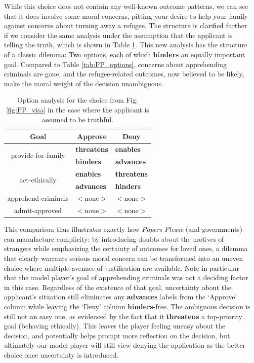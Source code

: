 \documentclass[arts,article,submit,moreauthors,pdftex,10pt,a4paper]{Definitions/mdpi}
\newcommand{\enables}{\textbf{\color{enables}enables}}
\newcommand{\advances}{\textbf{\color{advances}advances}}
\newcommand{\threatens}{\textbf{\color{threatens}threatens}}
\newcommand{\hinders}{\textbf{\color{hinders}hinders}}
\begin{document}
While this choice does not contain any well-known outcome patterns, we can see that it does involve some moral concerns, pitting your desire to help your family against concerns about turning away a refugee.
%
The structure is clarified further if we consider the same analysis under the assumption that the applicant is telling the truth, which is shown in Table \ref{tab:PP_trusting_options}.
%
This new analysis has the structure of a classic dilemma: Two options, each of which \hinders{} an equally important goal.
%
Compared to Table \ref{tab:PP_options}, concerns about apprehending criminals are gone, and the refugee-related outcomes, now believed to be likely, make the moral weight of the decision unambiguous.

\begin{table}[H]
\centering
\begin{tabular}{c l l}
  \toprule
  \textbf{Goal} & \multicolumn{1}{c}{\textbf{Approve}} & \multicolumn{1}{c}{\textbf{Deny}} \\
  \midrule
  \multirow{2}{9em}{\centering provide-for-family} & \threatens{} & \enables{} \\
                                                   & \hinders{}   & \advances{} \\
  \midrule
  \multirow{2}{9em}{\centering act-ethically} & \enables{}  & \threatens{} \\
                                              & \advances{} & \hinders{} \\
  \midrule
  apprehend-criminals & $<$none$>$ & $<$none$>$ \\
  \midrule
  admit-approved & $<$none$>$ & $<$none$>$ \\
  \bottomrule
\end{tabular}
\caption[Alternate option analysis]{Option analysis for the choice from Fig. \ref{fig:PP_visa} in the case where the applicant is assumed to be truthful.}
\label{tab:PP_trusting_options}
\end{table}


This comparison thus illustrates exactly how \emph{Papers Please} (and governments) can manufacture complicity: by introducing doubts about the motives of strangers while emphasizing the certainty of outcomes for loved ones, a dilemma that clearly warrants serious moral concern can be transformed into an uneven choice where multiple avenues of justification are available.
%
Note in particular that the model player's goal of apprehending criminals was not a deciding factor in this case.
%
Regardless of the existence of that goal, uncertainty about the applicant's situation still eliminates any \advances{} labels from the `Approve' column while leaving the `Deny' column \hinders{}-free.
%
The ambiguous decision is still not an easy one, as evidenced by the fact that it \threatens{} a top-priority goal (behaving ethically).
%
This leaves the player feeling uneasy about the decision, and potentially helps prompt more reflection on the decision, but ultimately our model player will still view denying the application as the better choice once uncertainty is introduced.
\end{document}
